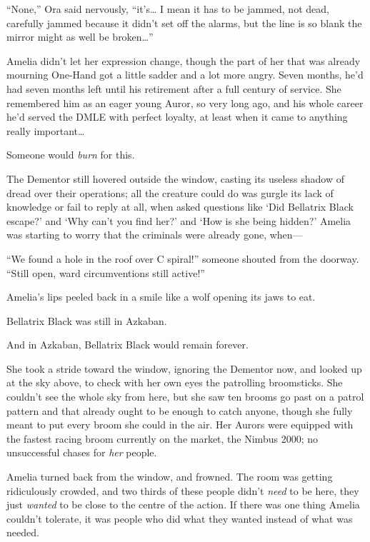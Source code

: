 ``None,'' Ora said nervously, ``it's\ldots{} I mean it has to be jammed,
not dead, carefully jammed because it didn't set off the alarms, but the
line is so blank the mirror might as well be broken\ldots{}''

Amelia didn't let her expression change, though the part of her that was
already mourning One-Hand got a little sadder and a lot more angry.
Seven months, he'd had seven months left until his retirement after a
full century of service. She remembered him as an eager young Auror, so
very long ago, and his whole career he'd served the DMLE with perfect
loyalty, at least when it came to anything really important\ldots{}

Someone would \emph{burn} for this.

The Dementor still hovered outside the window, casting its useless
shadow of dread over their operations; all the creature could do was
gurgle its lack of knowledge or fail to reply at all, when asked
questions like `Did Bellatrix Black escape?' and `Why can't you find
her?' and `How is she being hidden?' Amelia was starting to worry that
the criminals were already gone, when---

``We found a hole in the roof over C spiral!'' someone shouted from the
doorway. ``Still open, ward circumventions still active!''

Amelia's lips peeled back in a smile like a wolf opening its jaws to
eat.

Bellatrix Black was still in Azkaban.

And in Azkaban, Bellatrix Black would remain forever.

She took a stride toward the window, ignoring the Dementor now, and
looked up at the sky above, to check with her own eyes the patrolling
broomsticks. She couldn't see the whole sky from here, but she saw ten
brooms go past on a patrol pattern and that already ought to be enough
to catch anyone, though she fully meant to put every broom she could in
the air. Her Aurors were equipped with the fastest racing broom
currently on the market, the Nimbus 2000; no unsuccessful chases for
\emph{her} people.

Amelia turned back from the window, and frowned. The room was getting
ridiculously crowded, and two thirds of these people didn't \emph{need}
to be here, they just \emph{wanted} to be close to the centre of the
action. If there was one thing Amelia couldn't tolerate, it was people
who did what they wanted instead of what was needed.

